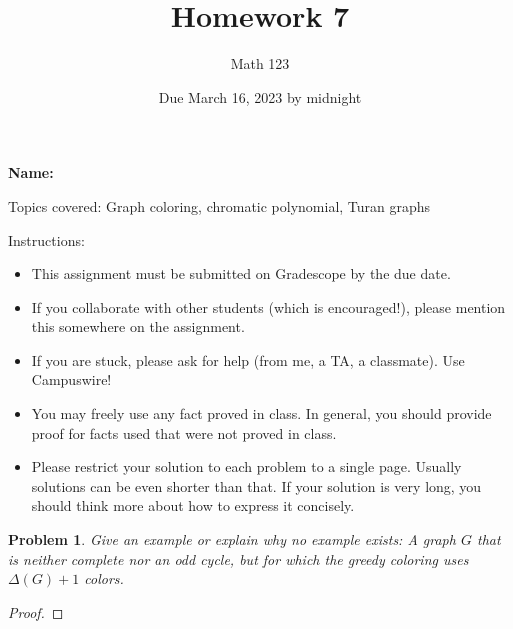 \documentclass[11pt]{article}
\author{Math 123}
\date{Due March 16, 2023 by midnight}
\title{Homework 7}
\newtheorem{problem}{Problem}
\begin{document}
\maketitle

{\bf\Large Name:} 


\vspace{.3in}
Topics covered: Graph coloring, chromatic polynomial, Turan graphs

Instructions: 
\begin{itemize}
\item This assignment must be submitted on Gradescope by the due date. 
\item If you collaborate with other students (which is encouraged!), please mention this somewhere on the assignment. 
\item If you are stuck, please ask for help (from me, a TA, a classmate). Use Campuswire!  
\item You may freely use any fact proved in class. In general, you should provide proof for facts used that were not proved in class. 
\item Please restrict your solution to each problem to a single page. Usually solutions can be even shorter than that. If your solution is very long, you should think more about how to express it concisely.
\end{itemize}


\pagebreak 


\begin{problem}
Give an example or explain why no example exists: A graph $G$ that is neither complete nor an odd cycle, but for which the greedy coloring uses $\Delta(G)+1$ colors. 
\end{problem}

\begin{proof}

\end{proof}

\pagebreak
\end{document}
